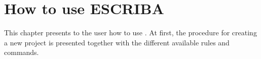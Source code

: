 \chapter{How to use ESCRIBA}

This chapter presents to the user how to use \ESCRIBA. At first, the procedure
for creating a new project is presented together with the different available
rules and commands.





